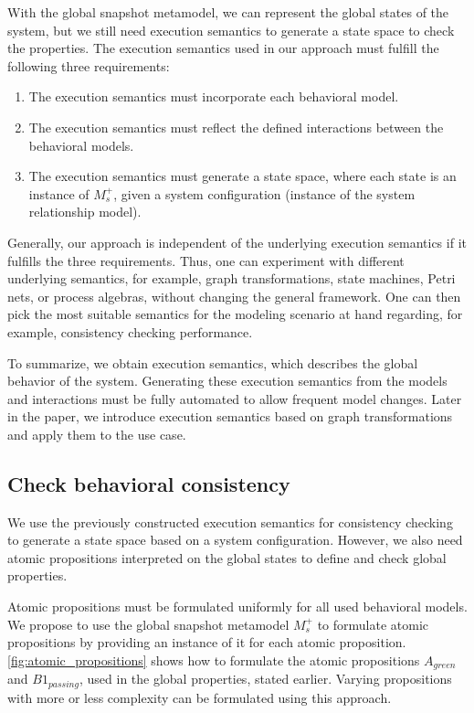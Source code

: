 \documentclass{jot}
\begin{document}
With the global snapshot metamodel, we can represent the global states of the system, but we still need execution semantics to generate a state space to check the properties.
The execution semantics used in our approach must fulfill the following three requirements:
\begin{enumerate}
    \item The execution semantics must incorporate each behavioral model.
    \item The execution semantics must reflect the defined interactions between the behavioral models.
    \item The execution semantics must generate a state space, where each state is an instance of $M_s^+$, given a system configuration (instance of the system relationship model).
\end{enumerate}
Generally, our approach is independent of the underlying execution semantics if it fulfills the three requirements.
Thus, one can experiment with different underlying semantics, for example, graph transformations, state machines, Petri nets, or process algebras, without changing the general framework.
One can then pick the most suitable semantics for the modeling scenario at hand regarding, for example, consistency checking performance.

To summarize, we obtain execution semantics, which describes the global behavior of the system.
Generating these execution semantics from the models and interactions must be fully automated to allow frequent model changes.
Later in the paper, we introduce execution semantics based on graph transformations and apply them to the use case.

\subsection{Check behavioral consistency}
We use the previously constructed execution semantics for consistency checking to generate a state space based on a system configuration.
However, we also need atomic propositions interpreted on the global states to define and check global properties.

Atomic propositions must be formulated uniformly for all used behavioral models.
We propose to use the global snapshot metamodel $M_s^+$ to formulate atomic propositions by providing an instance of it for each atomic proposition.
\autoref{fig:atomic_propositions} shows how to formulate the atomic propositions $A_{green}$ and $B1_{passing}$, used in the global properties, stated earlier.
Varying propositions with more or less complexity can be formulated using this approach.
\end{document}
